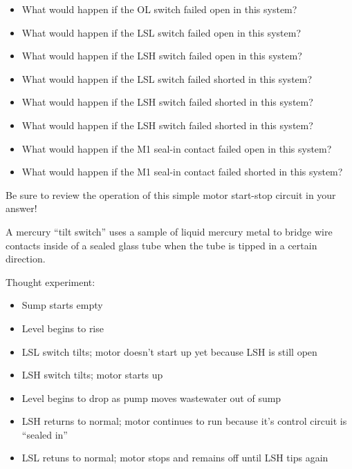 \begin{itemize}
\item{} What would happen if the OL switch failed open in this system?
\item{} What would happen if the LSL switch failed open in this system?
\item{} What would happen if the LSH switch failed open in this system?
\item{} What would happen if the LSL switch failed shorted in this system?
\item{} What would happen if the LSH switch failed shorted in this system?
\item{} What would happen if the LSH switch failed shorted in this system?
\item{} What would happen if the M1 seal-in contact failed open in this system?
\item{} What would happen if the M1 seal-in contact failed shorted in this system?
\end{itemize}







Be sure to review the operation of this simple motor start-stop circuit in your answer!







A mercury ``tilt switch'' uses a sample of liquid mercury metal to bridge wire contacts inside of a sealed glass tube when the tube is tipped in a certain direction.

\vskip 10pt

\noindent
Thought experiment:

\begin{itemize}
\item{} Sump starts empty
\item{} Level begins to rise
\item{} LSL switch tilts; motor doesn't start up yet because LSH is still open
\item{} LSH switch tilts; motor starts up
\item{} Level begins to drop as pump moves wastewater out of sump
\item{} LSH returns to normal; motor continues to run because it's control circuit is ``sealed in''
\item{} LSL retuns to normal; motor stops and remains off until LSH tips again
\end{itemize}










